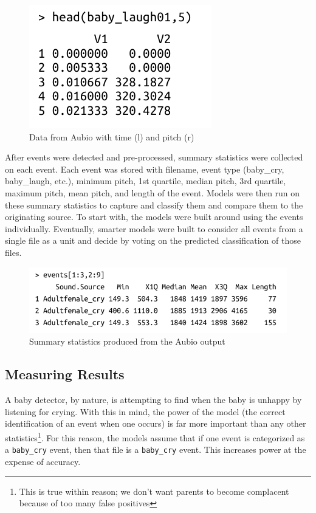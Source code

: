 \documentclass[paper=a4, fontsize=11pt]{scrartcl}
\numberwithin{equation}{section}
\numberwithin{figure}{section}
\numberwithin{table}{section}
\begin{document}
\begin{figure}
\begin{center}
\vspace{-15pt}
\includegraphics[width=.28\textwidth]{aubio_out.pdf}
\caption{Data from Aubio with time (l) and pitch (r)}\label{fig:headaubio}
\end{center}
\vspace{-20pt}
\end{figure}

After events were detected and pre-processed, summary statistics were collected on each event. Each event was stored with filename, event type (baby\_cry, baby\_laugh, etc.), minimum pitch, 1st quartile, median pitch, 3rd quartile, maximum pitch, mean pitch, and length of the event. Models were then run on these summary statistics to capture and classify them and compare them to the originating source. To start with, the models were built around using the events individually. Eventually, smarter models were built to consider all events from a single file as a unit and decide by voting on the predicted classification of those files.

\begin{figure}[H]
\begin{center}
\includegraphics[width=.65\textwidth]{aubio_events.pdf}
\caption{Summary statistics produced from the Aubio output}
\end{center}
\end{figure}

\subsection{Measuring Results}

A baby detector, by nature, is attempting to find when the baby is unhappy by listening for crying. With this in mind, the power of the model (the correct identification of an event when one occurs) is far more important than any other statistics\footnote{This is true within reason; we don't want parents to become complacent because of too many false positives}. For this reason, the models assume that if one event is categorized as a \texttt{baby\_cry} event, then that file is a \texttt{baby\_cry} event. This increases power at the expense of accuracy.
\end{document}
